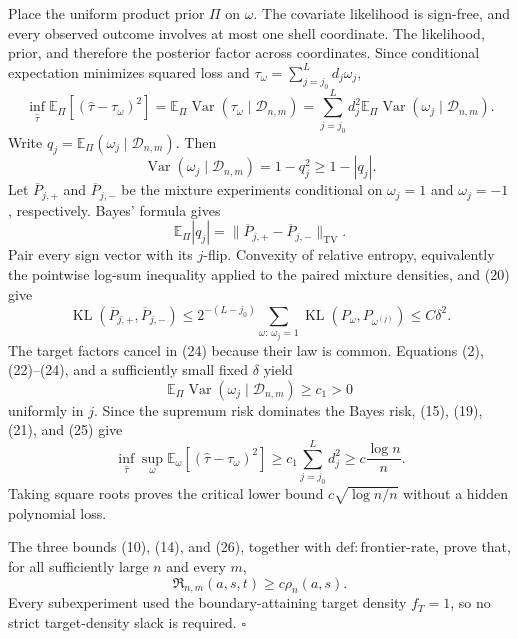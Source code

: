 Place the uniform product prior \(\Pi\) on \(\omega\).  The covariate likelihood is sign-free, and every observed outcome involves at most one shell coordinate.  The likelihood, prior, and therefore the posterior factor across coordinates.  Since conditional expectation minimizes squared loss and \(\tau_\omega=\sum_{j=j_0}^Ld_j\omega_j\),
\[
 \inf_{\widehat\tau}
 \mathbb E_\Pi[(\widehat\tau-\tau_\omega)^2]
 =
 \mathbb E_\Pi\operatorname{Var}
       (\tau_\omega\mid\mathcal D_{n,m})
 =\sum_{j=j_0}^Ld_j^2
   \mathbb E_\Pi\operatorname{Var}
       (\omega_j\mid\mathcal D_{n,m}).
\tag{21}
\]
Write \(q_j=\mathbb E_\Pi(\omega_j\mid\mathcal D_{n,m})\).  Then
\[
 \operatorname{Var}(\omega_j\mid\mathcal D_{n,m})
 =1-q_j^2\ge1-|q_j|.
\tag{22}
\]
Let \(\overline P_{j,+}\) and \(\overline P_{j,-}\) be the mixture experiments conditional on \(\omega_j=1\) and \(\omega_j=-1\), respectively.  Bayes' formula gives
\[
 \mathbb E_\Pi|q_j|
 =\|\overline P_{j,+}-\overline P_{j,-}\|_{\mathrm{TV}}.
\tag{23}
\]
Pair every sign vector with its \(j\)-flip.  Convexity of relative entropy, equivalently the pointwise log-sum inequality applied to the paired mixture densities, and (20) give
\[
 \operatorname{KL}(\overline P_{j,+},\overline P_{j,-})
 \le 2^{-(L-j_0)}
 \sum_{\omega:\,\omega_j=1}
 \operatorname{KL}(P_\omega,P_{\omega^{(j)}})
 \le C\delta^2.
\tag{24}
\]
The target factors cancel in (24) because their law is common.  Equations (2), (22)--(24), and a sufficiently small fixed \(\delta\) yield
\[
 \mathbb E_\Pi\operatorname{Var}
   (\omega_j\mid\mathcal D_{n,m})
 \ge c_1>0
\tag{25}
\]
uniformly in \(j\).  Since the supremum risk dominates the Bayes risk, (15), (19), (21), and (25) give
\[
 \inf_{\widehat\tau}\sup_\omega
 \mathbb E_\omega[(\widehat\tau-\tau_\omega)^2]
 \ge c_1\sum_{j=j_0}^Ld_j^2
 \ge c\frac{\log n}{n}.
\tag{26}
\]
Taking square roots proves the critical lower bound \(c\sqrt{\log n/n}\) without a hidden polynomial loss.

The three bounds (10), (14), and (26), together with \(\mathrm{def:frontier\text{-}rate}\), prove that, for all sufficiently large \(n\) and every \(m\),
\[
 \mathfrak R_{n,m}(a,s,t)\ge c\rho_n(a,s).
\]
Every subexperiment used the boundary-attaining target density \(f_T=1\), so no strict target-density slack is required. \(\square\)